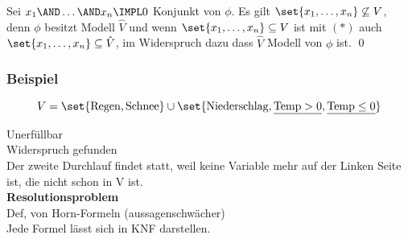 Sei $x_1\AND\dots\AND x_n \IMPL 0$ Konjunkt von $\phi$. Es gilt
$\set{x_1,\dots,x_n} \not\subseteq V$, denn $\phi$ besitzt Modell $\hat{V}$ und
wenn $\set{x_1,\dots,x_n}\subseteq V$ ist mit $(*)$ auch
$\set{x_1,\dots,x_n} \subseteq \hat{V}$, im Widerspruch dazu dass $\hat{V}$ Modell
von $\phi$ ist. \qed

\subsubsection{Beispiel}

\[
  V=\set{\text{Regen}, \text{Schnee}} \cup \set{\text{Niederschlag}, \underline{\text{Temp}>0}, \underline{\text{Temp}\leq 0}}
\]

Unerfüllbar\\
Widerspruch gefunden\\
Der zweite Durchlauf findet statt, weil keine Variable mehr auf der Linken Seite ist, die nicht schon in V ist.\\
\textbf{Resolutionsproblem}\\
Def, von Horn-Formeln (aussagenschwächer)\\
Jede Formel lässt sich in KNF darstellen.
